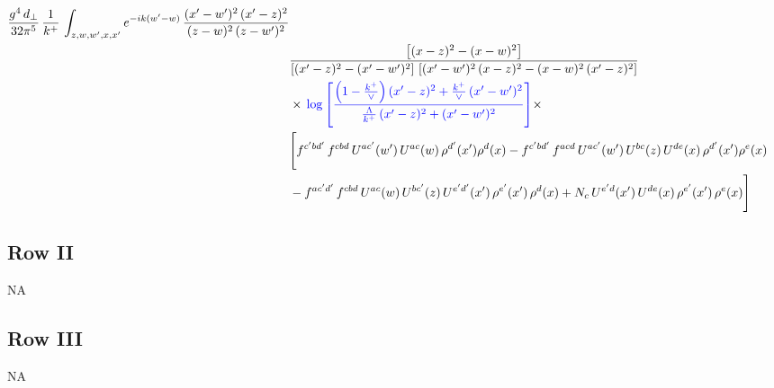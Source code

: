 \documentclass[9pt]{article}
\newcommand{\new}[1]{{\color{blue}#1}}
\numberwithin{equation}{section}
\begin{document}
\begin{align}
\frac{g^{4}\,d_{\perp}}{32\pi^{5}}\,\frac{1}{k^{+}}\,\int_{z,w,w^{\prime},x,x'} e^{-ik(w^{\prime}-w)}\,\frac{(x'-w')^{2}\, (x'-z)^{2}}{(z-w)^{2}\, (z-w')^{2}}\notag \\ & \frac{\left[(x-z)^{2} - (x-w)^{2}\right]}{\left[(x'-z)^{2} - (x'-w')^{2}\right]\, \left[(x'-w')^{2}\, (x - z)^{2} - (x-w)^{2}\,(x'-z)^{2}\right]}\notag \\ & \times\, \new{\log{\left[\frac{\left(1-\frac{k^{+}}{\vee}\right)(x'-z)^{2}+\frac{k^{+}}{\vee}\,(x'-w')^{2}}{\frac{\Lambda}{k^{+}}\,(x'-z)^{2}+(x'-w')^{2}}\right]}}\times \notag \\ &  \Bigg[f^{c'bd'}\,f^{cbd}\, U^{ac'}(w')\,U^{ac}(w)\,\rho^{d'}(x')\rho^{d}(x)- f^{c'bd'}\,f^{acd}\,U^{ac'}(w')\,U^{bc}(z)\,U^{de}(x)\,\rho^{d'}(x')\rho^{e}(x) \notag \\ & -f^{ac'd'}\,f^{cbd}\,U^{ac}(w)\,U^{bc'}(z)\,U^{e'd'}(x')\,\rho^{e'}(x')\,\rho^{d}(x) +N_{c}\,U^{e'd}(x')\,U^{de}(x)\,\rho^{e'}(x')\,\rho^{e}(x)\Bigg]
\end{align}
\subsection{Row II}
\textsc{NA}
\subsection{Row III}
\textsc{NA}
\end{document}

